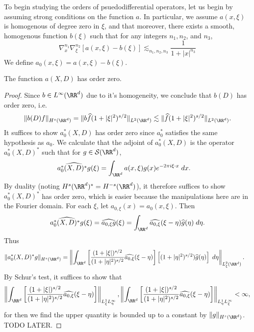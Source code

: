 To begin studying the orders of psuedodifferential operators, let us begin by assuming strong conditions on the function $a$. In particular, we assume $a(x,\xi)$ is homogenous of degree zero in $\xi$, and that moreover, there exists a smooth, homogenous function $b(\xi)$ such that for any integers $n_1,n_2$, and $n_3$,
%
\[ \nabla^{n_1}_x \nabla^{n_2}_\xi[a(x,\xi) - b(\xi)] \lesssim_{n_1,n_2,n_3} \frac{1}{1 + |x|^{n_3}} \]
%
We define $a_0(x,\xi) = a(x,\xi) - b(\xi)$.

\begin{theorem}
  The function $a(X,D)$ has order zero.
\end{theorem}
\begin{proof}
  Since $b \in L^\infty(\RR^d)$ due to it's homogeneity, we conclude that $b(D)$ has order zero, i.e.
  \[ \| b(D) f \|_{H^s(\RR^d)} = \| b \widehat{f} (1 + |\xi|^2)^{s/2} \|_{L^2(\RR^d)} \lesssim \| \widehat{f} (1 + |\xi|^2)^{s/2} \|_{L^2(\RR^d)}. \]
  It suffices to show $a_0^*(X,D)$ has order zero since $a_0^*$ satisfies the same hypothesis as $a_0$. We calculate that the adjoint of $a_0^*(X,D)$ is the operator $a_0^*(X,D)^*$ such that for $g \in \mathcal{S}(\RR^d)$,
  \begin{align*}
    \widehat{a_0^*(X,D)^* g}(\xi) &= \int_{\RR^d} a(x,\xi) g(x) e^{-2 \pi i \xi \cdot x}\; dx.
  \end{align*}
  By duality (noting $H^s(\RR^d)^* = H^{-s}(\RR^d)$), it therefore suffices to show $a_0^*(X,D)^*$ has order zero, which is easier because the manipulations here are in the Fourier domain. For each $\xi$, let $a_{0,\xi}(x) = a_0(x,\xi)$. Then
  \[ \widehat{a_0^*(X,D)^* g}(\xi) = \widehat{a_{0,\xi} g}(\xi) = \int_{\RR^d} \widehat{a_{0,\xi}}(\xi - \eta) \widehat{g}(\eta)\; d\eta. \]
  Thus
  \begin{align*}
    \| a_0^*(X,D)^* g \|_{H^s(\RR^d)} &= \left\| \int_{\RR^d} \left[ \frac{(1 + |\xi|)^{s/2}}{(1 + |\eta|^2)^{s/2}} \widehat{a_{0,\xi}}(\xi - \eta) \right] \left[(1 + |\eta|^2)^{s/2}) \widehat{g}(\eta)\right]\; d\eta \right\|_{L^2_\xi(\RR^d)}.
  \end{align*}
  By Schur's test, it suffices to show that
  \[ \left\| \int_{\RR^d} \left[ \frac{(1 + |\xi|)^{s/2}}{(1 + |\eta|^2)^{s/2}} \widehat{a_{0,\xi}}(\xi - \eta) \right] \right\|_{L^1_\xi L^\infty_\eta}, \left\| \int_{\RR^d} \left[ \frac{(1 + |\xi|)^{s/2}}{(1 + |\eta|^2)^{s/2}} \widehat{a_{0,\xi}}(\xi - \eta) \right] \right\|_{L^1_\eta L^\infty_\xi} < \infty, \]
  for then we find the upper quantity is bounded up to a constant by $\| g \|_{H^s(\RR^d)}$. TODO LATER.
\end{proof}

